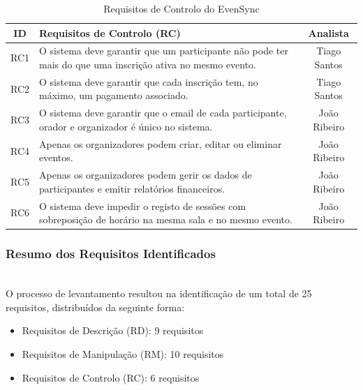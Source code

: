 \documentclass[runningheads]{llncs}
\begin{document}
                \vspace{0.2cm}

                \begin{table}[H]
                \centering
                \begin{tabular}{|c|p{}|c|}
                \hline
                \textbf{ID} & \textbf{Requisitos de Controlo (RC)} & \textbf{Analista} \\ \hline
                RC1 & O sistema deve garantir que um participante não pode ter mais do que uma inscrição ativa no mesmo evento. & Tiago Santos \\ \hline
                RC2 & O sistema deve garantir que cada inscrição tem, no máximo, um pagamento associado. & Tiago Santos \\ \hline
                RC3 & O sistema deve garantir que o email de cada participante, orador e organizador é único no sistema. & João Ribeiro \\ \hline
                RC4 & Apenas os organizadores podem criar, editar ou eliminar eventos. & João Ribeiro \\ \hline
                RC5 & Apenas os organizadores podem gerir os dados de participantes e emitir relatórios financeiros. & João Ribeiro \\ \hline
                RC6 & O sistema deve impedir o registo de sessões com sobreposição de horário na mesma sala e no mesmo evento. & João Ribeiro \\ \hline
                \end{tabular}
                \vspace{0.2cm}
                \caption{Requisitos de Controlo do EvenSync} \label{tab:requisitos_rc}
                \end{table}

                \newpage
                \subsubsection{Resumo dos Requisitos Identificados}\mbox{}\\

                O processo de levantamento resultou na identificação de um total de 25 requisitos,
                distribuídos da seguinte forma:
                \begin{itemize}
                    \item Requisitos de Descrição (RD): 9 requisitos
                    \item Requisitos de Manipulação (RM): 10 requisitos
                    \item Requisitos de Controlo (RC): 6 requisitos
                \end{itemize}
\end{document}
